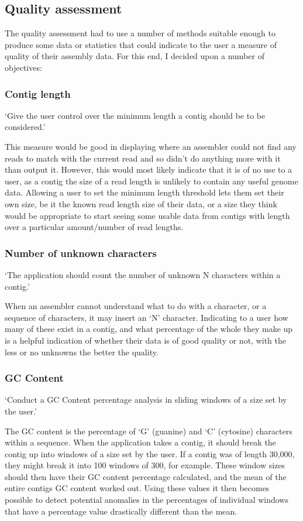 \subsection{Quality assessment}
The quality assessment had to use a number of methods suitable enough to produce some data or statistics that could indicate to the user a measure of quality of their assembly data. For this end, I decided upon a number of objectives:

\subsubsection{Contig length}
`Give the user control over the minimum length a contig should be to be considered.'

This measure would be good in displaying where an assembler could not find any reads to match with the current read and so didn't do anything more with it than output it. However, this would most likely indicate that it is of no use to a user, as a contig the size of a read length is unlikely to contain any useful genome data. Allowing a user to set the minimum length threshold lets them set their own size, be it the known read length size of their data, or a size they think would be appropriate to start seeing some usable data from contigs with length over a particular amount/number of read lengths.

\subsubsection{Number of unknown characters}
`The application should count the number of unknown N characters within a contig.'

When an assembler cannot understand what to do with a character, or a sequence of characters, it may insert an `N' character. Indicating to a user how many of these exist in a contig, and what percentage of the whole they make up is a helpful indication of whether their data is of good quality or not, with the less or no unknowns the better the quality.

\subsubsection{GC Content}
`Conduct a GC Content percentage analysis in sliding windows of a size set by the user.'

The GC content is the percentage of `G' (guanine) and `C' (cytosine) characters within a sequence\cite{citeulike:14021291}. When the application takes a contig, it should break the contig up into windows of a size set by the user. If a contig was of length 30,000, they might break it into 100 windows of 300, for example. These window sizes should then have their GC content percentage calculated, and the mean of the entire contigs GC content worked out. Using these values it then becomes possible to detect potential anomalies in the percentages of individual windows that have a percentage value drastically different than the mean.

